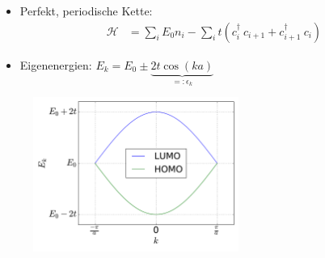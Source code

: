 \begin{frame}
\begin{itemize}
\item Perfekt, periodische Kette:
\begin{align*}
	\mathcal{H} &= \sum_i E_0 n_i - \sum_i t \left(c_i^\dagger\  c_{i+1} + c_{i+1}^\dagger\  c_i\right)
\end{align*}
\item Eigenenergien: $E_k = E_0 \pm \underbrace{2t\cos(ka)}_{=:\epsilon_k}$
\end{itemize}
\begin{figure}
\includegraphics[width =0.6\textwidth]{Images/Plots/bandstructure_symmetric}
\end{figure}
\end{frame}


